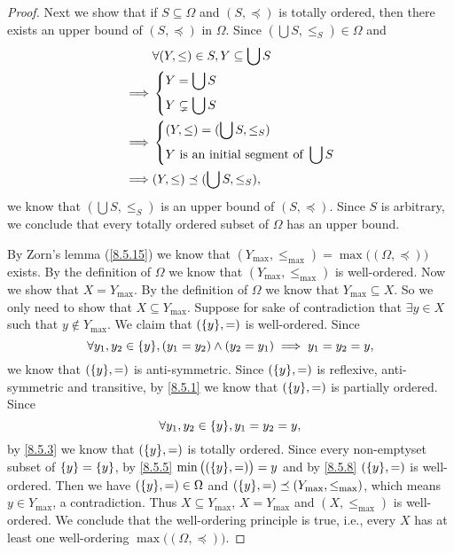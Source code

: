 \begin{proof}
  Next we show that if \(S \subseteq \Omega\) and \((S, \preceq)\) is totally ordered, then there exists an upper bound of \((S, \preceq)\) in \(\Omega\).
  Since \((\bigcup S, \leq_S) \in \Omega\) and
  \begin{align*}
             & \forall (Y, \leq) \in S, Y \subseteq \bigcup S \\
    \implies & \begin{dcases}
                 Y = \bigcup S \\
                 Y \subsetneq \bigcup S
               \end{dcases}                          \\
    \implies & \begin{dcases}
                 (Y, \leq) = (\bigcup S, \leq_S) \\
                 Y \text{ is an initial segment of } \bigcup S
               \end{dcases}   \\
    \implies & (Y, \leq) \preceq (\bigcup S, \leq_S),
  \end{align*}
  we know that \((\bigcup S, \leq_S)\) is an upper bound of \((S, \preceq)\).
  Since \(S\) is arbitrary, we conclude that every totally ordered subset of \(\Omega\) has an upper bound.

  By Zorn's lemma (\cref{8.5.15}) we know that \((Y_{\max}, \leq_{\max}) = \max\big((\Omega, \preceq)\big)\) exists.
  By the definition of \(\Omega\) we know that \((Y_{\max}, \leq_{\max})\) is well-ordered.
  Now we show that \(X = Y_{\max}\).
  By the definition of \(\Omega\) we know that \(Y_{\max} \subseteq X\).
  So we only need to show that \(X \subseteq Y_{\max}\).
  Suppose for sake of contradiction that \(\exists y \in X\) such that \(y \notin Y_{\max}\).
  We claim that \((\set{y}, =)\) is well-ordered.
  Since
  \[
    \forall y_1, y_2 \in \set{y}, (y_1 = y_2) \land (y_2 = y_1) \implies y_1 = y_2 = y,
  \]
  we know that \((\set{y}, =)\) is anti-symmetric.
  Since \((\set{y}, =)\) is reflexive, anti-symmetric and transitive, by \cref{8.5.1} we know that \((\set{y}, =)\) is partially ordered.
  Since
  \[
    \forall y_1, y_2 \in \set{y}, y_1 = y_2 = y,
  \]
  by \cref{8.5.3} we know that \((\set{y}, =)\) is totally ordered.
  Since every non-emptyset subset of \(\left\lbrace y\right\rbrace = \left\lbrace y\right\rbrace\), by \cref{8.5.5} \(\min\big((\set{y}, =)\big) = y\) and by \cref{8.5.8} \((\set{y}, =)\) is well-ordered.
  Then we have \((\set{y}, =) \in \Omega\) and \((\set{y}, =) \preceq (Y_{\max}, \leq_{\max})\), which means \(y \in Y_{\max}\), a contradiction.
  Thus \(X \subseteq Y_{\max}\), \(X = Y_{\max}\) and \((X, \leq_{\max})\) is well-ordered.
  We conclude that the well-ordering principle is true, i.e., every \(X\) has at least one well-ordering \(\max\big((\Omega, \preceq)\big)\).


\end{proof}
